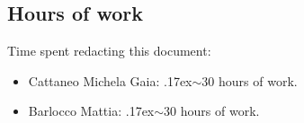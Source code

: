 \documentclass[18pt,oneside,a4paper, titlepage]{article}
\begin{document}
	\subsection{Hours of work}
		Time spent redacting this document:
		\begin{itemize}
			\item Cattaneo Michela Gaia: {\raise.17ex\hbox{$\scriptstyle\sim$}}30 hours of work.
			\item Barlocco Mattia: {\raise.17ex\hbox{$\scriptstyle\sim$}}30 hours of work.
		\end{itemize}
\end{document}
